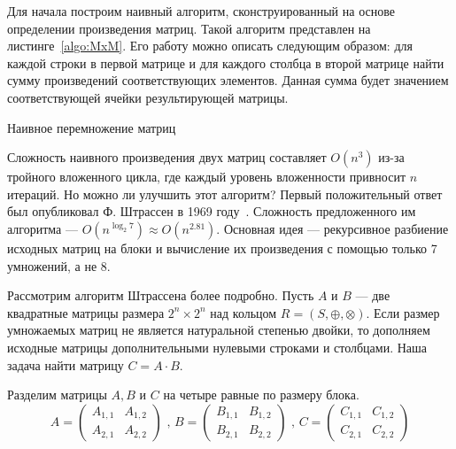 Для начала построим наивный алгоритм, сконструированный на основе определении произведения матриц. Такой алгоритм представлен на листинге~\ref{algo:MxM}. Его работу можно описать следующим образом: для каждой строки в первой матрице и для каждого столбца в второй матрице найти сумму произведений соответствующих элементов. Данная сумма будет значением соответствующей ячейки результирующей матрицы.

\begin{algorithm}
\begin{algorithmic}[1]\label{algo:MxM}
\caption{Наивное перемножение матриц}
    \EndFor
    \EndFor
    \EndFor

\EndFunction
\end{algorithmic}
\end{algorithm}

Сложность наивного произведения двух матриц составляет $O(n^3)$ из-за тройного вложенного цикла, где каждый уровень вложенности привносит $n$ итераций. Но можно ли улучшить этот алгоритм? Первый положительный ответ был опубликовал Ф. Штрассен в 1969 году~\cite{Strassen1969}. Сложность предложенного им алгоритма --- $O(n^{\log_2 7}) \approx O(n^{2.81})$. Основная идея --- рекурсивное разбиение исходных матриц на блоки и вычисление их произведения с помощью только 7 умножений, а не 8.

Рассмотрим алгоритм Штрассена более подробно. Пусть $A$ и $B$ --- две квадратные матрицы размера $2^n \times 2^n$ над кольцом $R=(S,\oplus,\otimes)$. Если размер умножаемых матриц не является натуральной степенью двойки, то дополняем исходные матрицы дополнительными нулевыми строками и столбцами. Наша задача найти матрицу $C = A \cdot B$.

Разделим матрицы $A, B$ и $C$ на четыре равные по размеру блока.
$$
A =
\begin{pmatrix}
  A_{1,1} & A_{1,2} \\
  A_{2,1} & A_{2,2}
 \end{pmatrix} \mbox{ , }
 B =
 \begin{pmatrix}
   B_{1,1} & B_{1,2} \\
   B_{2,1} & B_{2,2}
 \end{pmatrix} \mbox{ , }
 C =
 \begin{pmatrix}
   C_{1,1} & C_{1,2} \\
   C_{2,1} & C_{2,2}
 \end{pmatrix}
$$

